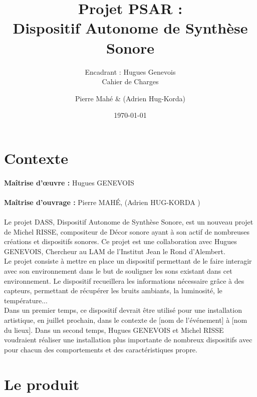 \documentclass[a4paper, titlepage, oneside, 12pt]{article}%
\title{Projet PSAR :\\ Dispositif Autonome de Synthèse Sonore}
\subtitle{Encadrant : Hugues Genevois \\ Cahier de Charges}
\author{Pierre Mahé \& (Adrien Hug-Korda)}
\date{\today}
\begin{document}
 
\maketitle 
\tableofcontents

\newpage

\section{Contexte}

\paragraph{}
\textbf{Maîtrise d’œuvre :} Hugues GENEVOIS
\vspace{-5mm}
\paragraph{}
\textbf{Maîtrise d’ouvrage :} Pierre MAHÉ, (Adrien HUG-KORDA )

\paragraph{}
Le projet DASS, Dispositif Autonome de Synthèse Sonore, est un nouveau projet de Michel RISSE, compositeur de Décor sonore ayant à son actif de nombreuses créations et dispositifs sonores. Ce projet est une collaboration avec Hugues GENEVOIS, Chercheur au LAM de l’Institut Jean le Rond d’Alembert.\\

Le projet consiste à mettre en place un dispositif permettant de le faire interagir avec son environnement dans le but de souligner les sons existant dans cet environnement.
Le dispositif recueillera les informations nécessaire grâce à des capteurs, permettant de récupérer les bruits ambiants, la luminosité, le température...\\

Dans un premier temps, ce dispositif devrait être utilisé pour une installation artistique, en juillet prochain, dans le contexte de [nom de l’événement] à [nom du lieux].
Dans un second temps, Hugues GENEVOIS et Michel RISSE voudraient réaliser une installation plus importante de nombreux dispositifs avec pour chacun des comportements et des caractéristiques propre.

\section{Le produit}
\end{document}
